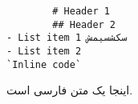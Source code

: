 \documentclass[12pt]{article}
\begin{document}

\begin{verbatim}
        # Header 1
        ## Header 2
- List item 1 سکشسیمش
- List item 2
`Inline code`
\end{verbatim}

اینجا یک متن فارسی است.
\end{document}
